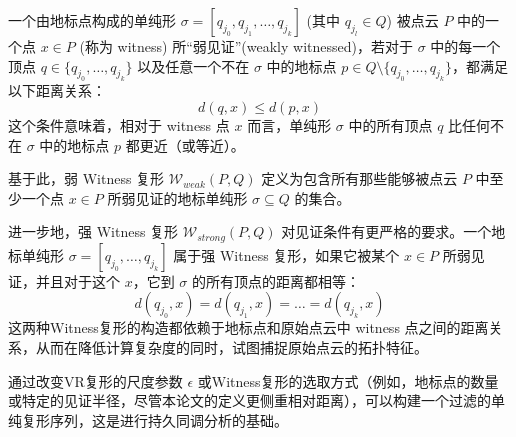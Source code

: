 一个由地标点构成的单纯形 $\sigma = [q_{j_0}, q_{j_1}, \ldots, q_{j_k}]$ (其中 $q_{j_l} \in Q$) 被点云 $P$ 中的一个点 $x \in P$ (称为 witness) 所“弱见证”(weakly witnessed)，若对于 $\sigma$ 中的每一个顶点 $q \in \{q_{j_0}, \ldots, q_{j_k}\}$ 以及任意一个不在 $\sigma$ 中的地标点 $p \in Q \setminus \{q_{j_0}, \ldots, q_{j_k}\}$，都满足以下距离关系：
\begin{equation}
d(q, x) \le d(p, x)
\end{equation}
这个条件意味着，相对于 witness 点 $x$ 而言，单纯形 $\sigma$ 中的所有顶点 $q$ 比任何不在 $\sigma$ 中的地标点 $p$ 都更近（或等近）。

基于此，弱 Witness 复形 $\mathcal{W}_{weak}(P, Q)$ 定义为包含所有那些能够被点云 $P$ 中至少一个点 $x \in P$ 所弱见证的地标单纯形 $\sigma \subseteq Q$ 的集合。

进一步地，强 Witness 复形 $\mathcal{W}_{strong}(P, Q)$ 对见证条件有更严格的要求。一个地标单纯形 $\sigma = [q_{j_0}, \ldots, q_{j_k}]$ 属于强 Witness 复形，如果它被某个 $x \in P$ 所弱见证，并且对于这个 $x$，它到 $\sigma$ 的所有顶点的距离都相等：
\begin{equation}
d(q_{j_0}, x) = d(q_{j_1}, x) = \ldots = d(q_{j_k}, x)
\end{equation}
这两种Witness复形的构造都依赖于地标点和原始点云中 witness 点之间的距离关系，从而在降低计算复杂度的同时，试图捕捉原始点云的拓扑特征。

通过改变VR复形的尺度参数 $\epsilon$ 或Witness复形的选取方式（例如，地标点的数量或特定的见证半径，尽管本论文的定义更侧重相对距离），可以构建一个过滤的单纯复形序列，这是进行持久同调分析的基础。
